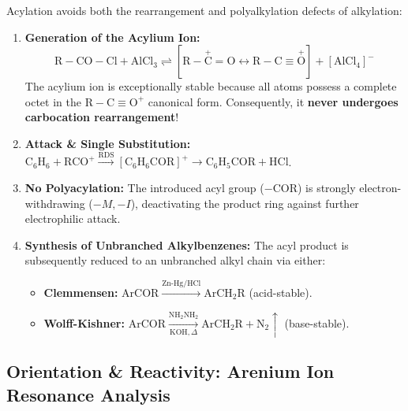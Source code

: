 \documentclass[10pt,twoside,openright]{book}
\begin{document}
\begin{conceptbox}
Acylation avoids both the rearrangement and polyalkylation defects of alkylation:
\begin{enumerate}[leftmargin=*]
  \item \textbf{Generation of the Acylium Ion:}
  \begin{equation}
    \mathrm{R-CO-Cl} + \mathrm{AlCl_3} \rightleftharpoons [\mathrm{R-\overset{+}{C}=O} \longleftrightarrow \mathrm{R-C\equiv \overset{+}{O}}] + [\mathrm{AlCl_4}]^-
  \end{equation}
  The acylium ion is exceptionally stable because all atoms possess a complete octet in the $\mathrm{R-C\equiv O^+}$ canonical form. Consequently, it \textbf{never undergoes carbocation rearrangement}!
  \item \textbf{Attack \& Single Substitution:} $\mathrm{C_6H_6} + \mathrm{RCO}^+ \xrightarrow{\text{RDS}} [\mathrm{C_6H_6COR}]^+ \to \mathrm{C_6H_5COR} + \mathrm{HCl}$.
  \item \textbf{No Polyacylation:} The introduced acyl group ($-\mathrm{COR}$) is strongly electron-withdrawing ($-M, -I$), deactivating the product ring against further electrophilic attack.
  \item \textbf{Synthesis of Unbranched Alkylbenzenes:} The acyl product is subsequently reduced to an unbranched alkyl chain via either:
  \begin{itemize}[leftmargin=*]
    \item \textbf{Clemmensen:} $\mathrm{ArCOR} \xrightarrow{\mathrm{Zn\text{-}Hg/HCl}} \mathrm{ArCH_2R}$ (acid-stable).
    \item \textbf{Wolff-Kishner:} $\mathrm{ArCOR} \xrightarrow[\mathrm{KOH}, \Delta]{\mathrm{NH_2NH_2}} \mathrm{ArCH_2R} + \mathrm{N_2}\uparrow$ (base-stable).
  \end{itemize}
\end{enumerate}
\end{conceptbox}

\subsection{Orientation \& Reactivity: Arenium Ion Resonance Analysis}
\end{document}
